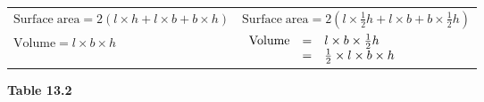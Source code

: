 {\begin{center}
      \label{m39357*eip-742}
      
    \noindent
      \tablelasttail{}
      \begin{xtabular*}{\mytablewidth}[t]{|p{10\mystarwidth}|p{10\mystarwidth}|}\hline
    
    
        $\mathrm{Surface\; area}=2\left(l\ensuremath{\times}h+l\ensuremath{\times}b+b\ensuremath{\times}h\right)$ &
    
    
        $\mathrm{Surface\; area}=2\left(l\ensuremath{\times}\frac{1}{2}h+l\ensuremath{\times}b+b\ensuremath{\times}\frac{1}{2}h\right)$%
     \tabularnewline{}
    
    
        $\mathrm{Volume}=l\ensuremath{\times}b\ensuremath{\times}h$ &
    
    
        $\begin{array}{ccc}\hfill \mathrm{Volume}& =& l\ensuremath{\times}b\ensuremath{\times}\frac{1}{2}h\hfill \\ & =& \frac{1}{2}\ensuremath{\times}l\ensuremath{\times}b\ensuremath{\times}h\hfill \end{array}$%
     \tabularnewline{}
    \end{xtabular*}
      \end{center}
    \begin{center}{\small\bfseries Table 13.2}\end{center}
    
    \addtocounter{footnote}{-0}
    
        }%
      

